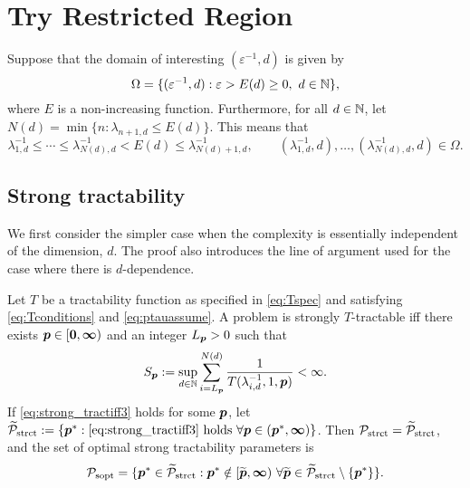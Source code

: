 \documentclass[11pt,a4paper]{article}
\begin{document}
\section{Try Restricted Region}

Suppose that the domain of interesting $(\varepsilon^{-1},d)$ is given by 
\begin{equation}
    \Omega  = \{(\varepsilon^{-1},d) : \varepsilon > E(d) \ge 0, \ d \in \mathbb{N} \},
\end{equation}
where $E$ is a non-increasing function.  Furthermore, for all $d \in \mathbb{N}$, let $N(d) = \min \{n : \lambda_{n+1,d} \le E(d) \}$.  This means that 
\[
\lambda_{1,d}^{-1} \le \cdots \le \lambda_{N(d),d}^{-1} < E(d) \le \lambda_{N(d)+1,d}^{-1}, \qquad (\lambda_{1,d}^{-1},d), \ldots, (\lambda_{N(d),d}^{-1},d) \in \Omega.
\]

\subsection{Strong tractability}

We first consider the simpler case when the complexity is essentially independent of the dimension, $d$.  The proof also introduces the line of argument used for the case where there is $d$-dependence.

\begin{theorem}\label{thm_main_strong_tract2}
Let $T$ be a tractability function as specified in \eqref{eq:Tspec} and satisfying \eqref{eq:Tconditions} and \eqref{eq:ptauassume}.  A problem is strongly $T$-tractable iff there exists $\boldsymbol{p} \in [\boldsymbol{0}, \boldsymbol{\infty})$ and an integer $L_{\boldsymbol{p}} > 0$ such that
\begin{equation} \label{eq:strong_tractiff3}
     S_{\boldsymbol{p}}:=\sup_{d \in \mathbb{N}} \sum_{i = L_{\boldsymbol{p}}}^{N(d)} \frac{1}{T(\lambda_{i,d}^{-1},1,\boldsymbol{p})} < \infty.
\end{equation}
If \eqref{eq:strong_tractiff3} holds for some $\boldsymbol{p}$, let  $\widetilde{\mathcal{P}}_{\textup{strct}} : = \{\boldsymbol{p}^* : \eqref{eq:strong_tractiff3} \text{ holds }\forall \boldsymbol{p} \in (\boldsymbol{p}^*,\boldsymbol{\infty})\}$.  Then $\mathcal{P}_{\textup{strct}} = \widetilde{\mathcal{P}}_{\textup{strct}}$, and the set of optimal strong tractability parameters is
\[
	\mathcal{P}_{\textup{sopt}} =
	\{\boldsymbol{p}^* \in \widetilde{\mathcal{P}}_{\textup{strct}} :  \boldsymbol{p}^* \notin [\widetilde{\boldsymbol{p}},\boldsymbol{\infty}) \ \forall \widetilde{\boldsymbol{p}}\in  \widetilde{\mathcal{P}}_{\textup{strct}} \setminus \{\boldsymbol{p}^*\} \}.
\]
\end{theorem}
\end{document}
